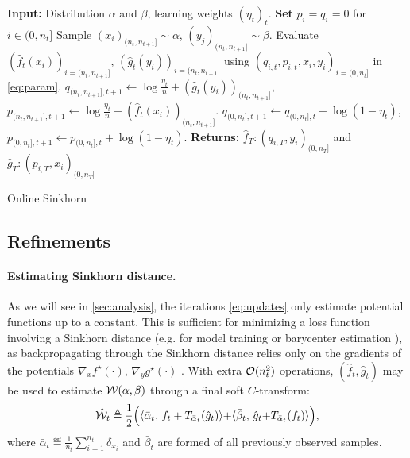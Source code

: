 \begin{algorithm}[t]
    \begin{algorithmic}
    \State \textbf{Input:} Distribution $\alpha$ and $\beta$, learning weights ${(\eta_t)}_t$. 
    \textbf{Set} $p_i = q_i = 0$ for $i \in (0, n_t]$
        \State Sample $(x_i)_{(n_t, n_{t+1}]} \sim \alpha$, $(y_j)_{(n_t, n_{t+1}]} \sim \beta$.
            \State Evaluate $(\hat f_t(x_i))_{i=(n_t, n_{t+1}]}$,
             $(\hat g_t(y_i))_{i=(n_t, n_{t+1}]}$ using $(q_{i,t}, p_{i,t}, x_i, y_i)_{i=(0,n_{t}]}$ in \eqref{eq:param}.
             \State $q_{(n_t, n_{t+1}],t+1} {\gets} \log \frac{\eta_t}{n}
             + (\hat g_t(y_i))_{(n_t, n_{t+1}]}$,
             \qquad $p_{(n_t, n_{t+1}],t+1} {\gets} \log \frac{\eta_t}{n} 
             + (\hat f_t(x_i))_{(n_t, n_{t+1}]}$.
            \State $q_{(0, n_t],t+1} \gets q_{(0, n_t],t} + \log(1 - \eta_t)$, \qquad
            $p_{(0, n_t],t+1} \gets p_{(0, n_t],t} + \log(1 - \eta_t)$.
    \EndFor
    \State \textbf{Returns:} $\hat f_T : (q_{i,T}, y_i)_{(0, n_T]}$ and
    $\hat g_T : (p_{i,T}, x_i)_{(0, n_T]}$
    \end{algorithmic}
    \caption{Online Sinkhorn}\label{alg:online_sinkhorn}
\end{algorithm}


\subsection{Refinements}

\paragraph{Estimating Sinkhorn distance.} 

As we will see in \autoref{sec:analysis}, the iterations \eqref{eq:updates} only estimate potential functions up to a
constant. This is sufficient for minimizing a loss function involving a Sinkhorn
distance (e.g. for model training or barycenter estimation \citep{staib2017parallel}), as backpropagating through the Sinkhorn distance
relies only on the gradients of the potentials $\nabla_x f^\star(\cdot)$,
$\nabla_y g^\star(\cdot)$ \citep[e.g.][]{cuturi2018semidual}. With extra
$\Oo(n_t^2)$ operations, $(\hat f_t, \hat g_t)$ may be used to
estimate $\Ww(\alpha,\beta)$ through a final soft $C$-transform:
\begin{equation}\label{eq-dist-est}
    \hat \Ww_t \triangleq \frac{1}{2}\Big(\dotp{\bar \alpha_t}{f_t + 
    \Ctrans{\hat g_t}{\bar \alpha_t}}
     {+} \dotp{\bar \beta_t}{\hat g_t {+} \Ctrans{f_t}{\bar \alpha_t}}\Big),
\end{equation}
where $\bar \alpha_t \eqdef \frac{1}{n_{t}}\sum_{i=1}^{n_{t}} \delta_{x_i}$
and $\bar \beta_t$ are formed of all previously observed samples.

